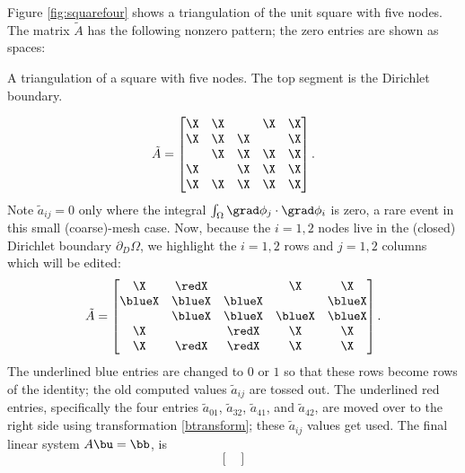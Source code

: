 \medskip\noindent\hrulefill
\begin{example} Figure \ref{fig:squarefour} shows a triangulation of the unit square with five nodes.  The matrix $\tilde A$ has the following nonzero pattern; the zero entries are shown as spaces:\begin{marginfigure}

\caption{A triangulation of a square with five nodes.  The top segment is the Dirichlet boundary.}
\label{fig:squarefour}
\end{marginfigure}%
\begin{equation*}
\tilde A = \begin{bmatrix}
\X & \X &    & \X & \X \\
\X & \X & \X &    & \X \\
   & \X & \X & \X & \X \\
\X &    & \X & \X & \X \\
\X & \X & \X & \X & \X
\end{bmatrix}.
\end{equation*}
Note $\tilde a_{ij}=0$ only where the integral $\int_\Omega \grad \phi_j \cdot \grad \phi_i$ is zero, a rare event in this small (coarse)-mesh case.  Now, because the $i=1,2$ nodes live in the (closed) Dirichlet boundary $\partial_D \Omega$, we highlight the $i=1,2$ rows and $j=1,2$ columns which will be edited:
\begin{equation*}
\tilde A = \begin{bmatrix}
\X & \redX &    & \X & \X \\
\blueX & \blueX & \blueX &    & \blueX \\
   & \blueX & \blueX & \blueX & \blueX \\
\X &    & \redX & \X & \X \\
\X & \redX & \redX & \X & \X
\end{bmatrix}.
\end{equation*}
The underlined {\color{blue} blue} entries are changed to $0$ or $1$ so that these rows become rows of the identity; the old computed values $\tilde a_{ij}$ are tossed out.  The underlined {\color{red} red} entries, specifically the four entries $\tilde a_{01}$, $\tilde a_{32}$, $\tilde a_{41}$, and $\tilde a_{42}$, are moved over to the right side using transformation \eqref{btransform}; these $\tilde a_{ij}$ values get used.  The final linear system $A \bu = \bb$, is
\begin{equation*}
\begin{bmatrix}

\end{bmatrix}
\end{equation*}
\end{example}
